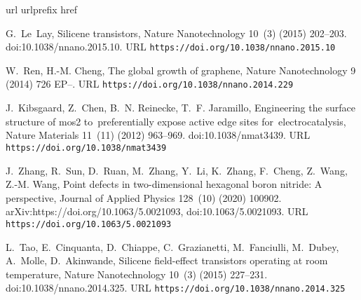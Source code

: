 \documentclass[5p,twocolumn]{elsarticle}
\begin{document}
\begin{thebibliography}{10}
	\expandafter\ifx\csname url\endcsname\relax
	\def\url#1{\texttt{#1}}\fi
	\expandafter\ifx\csname urlprefix\endcsname\relax\def\urlprefix{URL }\fi
	\expandafter\ifx\csname href\endcsname\relax
	\def\href#1#2{#2} \def\path#1{#1}\fi
	
	G.~Le~Lay, \href{https://doi.org/10.1038/nnano.2015.10}{Silicene transistors},
	Nature Nanotechnology 10~(3) (2015) 202--203.
	\newblock \href {https://doi.org/10.1038/nnano.2015.10}
	{\path{doi:10.1038/nnano.2015.10}}.
	\newline\urlprefix\url{https://doi.org/10.1038/nnano.2015.10}
	
	W.~Ren, H.-M. Cheng, \href{https://doi.org/10.1038/nnano.2014.229}{The global
		growth of graphene}, Nature Nanotechnology 9 (2014) 726 EP--.
	\newline\urlprefix\url{https://doi.org/10.1038/nnano.2014.229}
	
	J.~Kibsgaard, Z.~Chen, B.~N. Reinecke, T.~F. Jaramillo,
	\href{https://doi.org/10.1038/nmat3439}{Engineering the surface structure of
		mos2 to preferentially expose active edge sites for electrocatalysis},
	Nature Materials 11~(11) (2012) 963--969.
	\newblock \href {https://doi.org/10.1038/nmat3439}
	{\path{doi:10.1038/nmat3439}}.
	\newline\urlprefix\url{https://doi.org/10.1038/nmat3439}
	
	J.~Zhang, R.~Sun, D.~Ruan, M.~Zhang, Y.~Li, K.~Zhang, F.~Cheng, Z.~Wang, Z.-M.
	Wang, \href{https://doi.org/10.1063/5.0021093}{Point defects in
		two-dimensional hexagonal boron nitride: A perspective}, Journal of Applied
	Physics 128~(10) (2020) 100902.
	\newblock \href {http://arxiv.org/abs/https://doi.org/10.1063/5.0021093}
	{\path{arXiv:https://doi.org/10.1063/5.0021093}}, \href
	{https://doi.org/10.1063/5.0021093} {\path{doi:10.1063/5.0021093}}.
	\newline\urlprefix\url{https://doi.org/10.1063/5.0021093}
	
	L.~Tao, E.~Cinquanta, D.~Chiappe, C.~Grazianetti, M.~Fanciulli, M.~Dubey,
	A.~Molle, D.~Akinwande,
	\href{https://doi.org/10.1038/nnano.2014.325}{Silicene field-effect
		transistors operating at room temperature}, Nature Nanotechnology 10~(3)
	(2015) 227--231.
	\newblock \href {https://doi.org/10.1038/nnano.2014.325}
	{\path{doi:10.1038/nnano.2014.325}}.
	\newline\urlprefix\url{https://doi.org/10.1038/nnano.2014.325}
	

\end{thebibliography}
\end{document}
